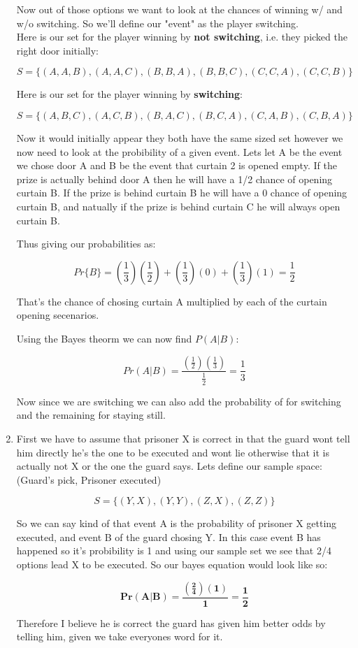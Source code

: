\documentclass{article}
\begin{document}
\begin{enumerate}
    Now out of those options we want to look at the chances of winning w/ and w/o switching. So we'll define our "event" as the player switching. \\
    
    Here is our set for the player winning by \textbf{not switching}, i.e. they picked the right door initially:
    
    \[S = \{(A,A,B),(A,A,C),(B,B,A),(B,B,C),(C,C,A),(C,C,B)\}\]

    Here is our set for the player winning by \textbf{switching}:

    \[S = \{(A,B,C),(A,C,B),(B,A,C),(B,C,A),(C,A,B),(C,B,A)\}\]

    Now it would initially appear they both have the same sized set however we now need to look at the probibility of a given event. 
    Lets let A be the event we chose door A and B be the event that curtain 2 is opened empty.
    If the prize is actually behind door A then he will have a 1/2 chance of opening curtain B. If the prize is behind curtain B he will have a 0 chance of opening curtain B, and natually if the prize is behind curtain C he will always open curtain B.

    Thus giving our probabilities as:

    \[Pr\{B\} = (\frac{1}{3})(\frac{1}{2}) + (\frac{1}{3})(0) + (\frac{1}{3})(1) = \frac{1}{2}\]

    That's the chance of chosing curtain A multiplied by each of the curtain opening secenarios. 

    Using the Bayes theorm we can now find $P(A|B)$:

    \[Pr(A|B) = \frac{(\frac{1}{2})(\frac{1}{3})}{\frac{1}{2}} = \frac{1}{3}\]

    Now since we are switching we can also add the probability of  for switching and the remaining  for staying still.

    \item First we have to assume that prisoner X is correct in that the guard wont tell him directly he's the one to be executed and wont lie otherwise that it is actually not X or the one the guard says. Lets define our sample space: \\
    
    (Guard's pick, Prisoner executed)
    
    \[S = \{(Y,X),(Y,Y),(Z,X),(Z,Z)\}\]

    So we can say kind of that event A is the probability of prisoner X getting executed, and event B of the guard chosing Y. In this case event B has happened so it's probibility is 1 and using our sample set we see that 2/4 options lead X to be executed. So our bayes equation would look like so:
    
    \[\bm{Pr(A|B) = \frac{(\frac{2}{4})(1)}{1} = \frac{1}{2}}\]

    Therefore I believe he is correct the guard has given him better odds by telling him, given we take everyones word for it.



  \end{enumerate}
\end{document}
